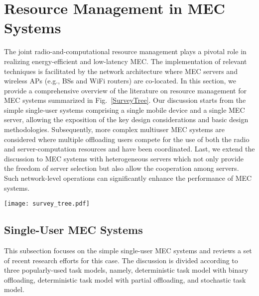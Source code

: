 \documentclass[journal]{IEEEtran}
\begin{document}
\section{Resource Management in MEC Systems}\label{Section:Resource:Management}
The joint radio-and-computational resource management plays a pivotal role in realizing energy-efficient and low-latency MEC. The implementation of relevant techniques is facilitated by the network architecture where MEC servers and wireless APs (e.g., BSs and WiFi routers) are co-located.  In this section, we provide a comprehensive overview of the  literature on resource management  for MEC systems summarized in Fig.~\ref{SurveyTree}. Our discussion starts from the simple single-user systems comprising  a single mobile device and a single MEC server, allowing the exposition of  the key design considerations and basic design methodologies. Subsequently,  more complex multiuser  MEC systems are considered where multiple offloading users compete for the use of both the  radio and server-computation  resources and have been coordinated. Last, we  extend the discussion to MEC systems with heterogeneous  servers which not only provide the freedom of server selection but also allow  the cooperation among  servers. Such network-level  operations can  significantly enhance the performance of MEC systems.

\begin{figure*}[!t]
\begin{center}
   \texttt{[image: survey\_tree.pdf]}
\end{center}
\caption{Classification of resource management techniques for MEC.}
\label{SurveyTree}
\end{figure*}

\subsection{Single-User MEC Systems}
This subsection focuses on the simple single-user MEC systems and reviews a set of recent research efforts for this case. The discussion is divided according to three  popularly-used task models, namely, deterministic task model with binary offloading, deterministic task model with partial offloading,  and stochastic task model.
\end{document}
